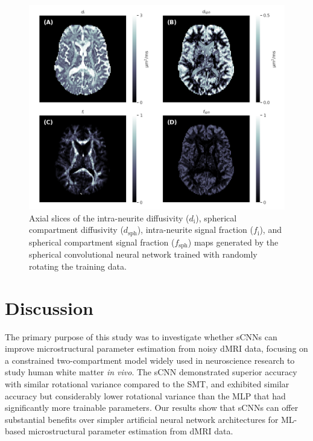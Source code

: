 \documentclass[10pt, letterpaper, oneside]{article}
\begin{document}
\begin{figure}
  \centering
  \includegraphics[width=.99\linewidth]{figures/3-compartment-model-maps.png}
  \caption{Axial slices of the intra-neurite diffusivity ($d_\text{i}$), spherical compartment diffusivity ($d_\text{sph}$), intra-neurite signal fraction ($f_\text{i}$), and spherical compartment signal fraction ($f_\text{sph}$) maps generated by the spherical convolutional neural network trained with randomly rotating the training data.}
  \label{fig:3-compartment_model_maps}
\end{figure}

\FloatBarrier

\section{Discussion}

The primary purpose of this study was to investigate whether sCNNs can improve microstructural parameter estimation from noisy dMRI data, focusing on a constrained two-compartment model widely used in neuroscience research to study human white matter \textit{in vivo}. The sCNN demonstrated superior accuracy with similar rotational variance compared to the SMT, and exhibited similar accuracy but considerably lower rotational variance than the MLP that had significantly more trainable parameters. Our results show that sCNNs can offer substantial benefits over simpler artificial neural network architectures for ML-based microstructural parameter estimation from dMRI data.
\end{document}
